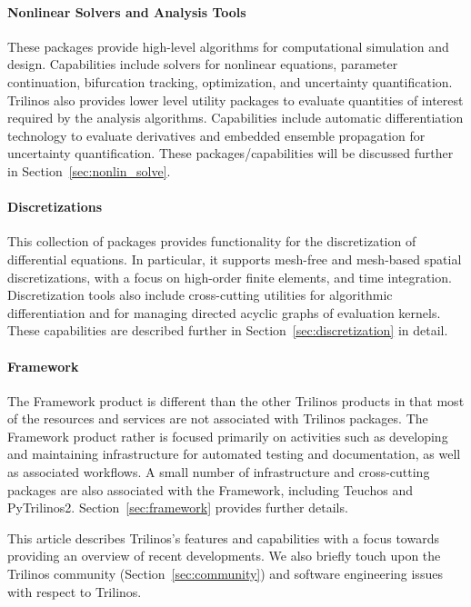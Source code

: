 \paragraph{Nonlinear Solvers and Analysis Tools} These packages provide high-level algorithms for computational simulation and design. Capabilities include solvers for nonlinear equations, parameter continuation, bifurcation tracking, optimization, and uncertainty quantification. Trilinos also provides lower level utility packages to evaluate quantities of interest required by the analysis algorithms. Capabilities include automatic differentiation technology to evaluate derivatives and embedded ensemble propagation for uncertainty quantification. These packages/capabilities will be discussed further in Section~\ref{sec:nonlin_solve}.

\paragraph{Discretizations} This collection of packages provides functionality for the discretization of differential equations. In particular, it supports mesh-free and mesh-based spatial discretizations, with a focus on high-order finite elements, and time integration. Discretization tools also include cross-cutting utilities for algorithmic differentiation and for managing directed acyclic graphs of evaluation kernels. These capabilities are described further in Section~\ref{sec:discretization} in detail.

\paragraph{Framework} The Framework product is different than the other Trilinos products in that most of the resources and services are not associated with Trilinos packages. The Framework product rather is focused primarily on activities such as developing and maintaining infrastructure for automated testing and documentation, as well as associated workflows. A small number of infrastructure and cross-cutting packages are also associated with the Framework, including Teuchos and PyTrilinos2. Section~\ref{sec:framework} provides further details.


\vspace{2.0ex} This article describes Trilinos's features and capabilities with a focus towards providing an overview of recent developments. We also briefly touch upon the Trilinos community (Section~\ref{sec:community}) and software engineering issues with respect to Trilinos.
